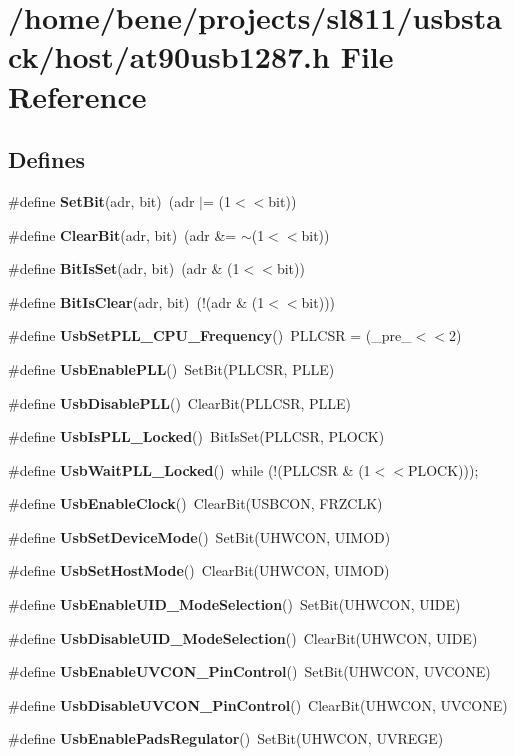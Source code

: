\section{/home/bene/projects/sl811/usbstack/host/at90usb1287.h File Reference}
\label{at90usb1287_8h}
\subsection*{Defines}
\begin{CompactItemize}
\item 
\#define {\bf Set\-Bit}(adr, bit)~(adr $|$=  (1$<$$<$bit))
\item 
\#define {\bf Clear\-Bit}(adr, bit)~(adr \&= $\sim$(1$<$$<$bit))
\item 
\#define {\bf Bit\-Is\-Set}(adr, bit)~(adr \& (1$<$$<$bit))
\item 
\#define {\bf Bit\-Is\-Clear}(adr, bit)~(!(adr \& (1$<$$<$bit)))
\item 
\#define {\bf Usb\-Set\-PLL\_\-CPU\_\-Frequency}()~PLLCSR = (\_\-pre\_\-$<$$<$2)
\item 
\#define {\bf Usb\-Enable\-PLL}()~Set\-Bit(PLLCSR, PLLE)
\item 
\#define {\bf Usb\-Disable\-PLL}()~Clear\-Bit(PLLCSR, PLLE)
\item 
\#define {\bf Usb\-Is\-PLL\_\-Locked}()~Bit\-Is\-Set(PLLCSR, PLOCK)
\item 
\#define {\bf Usb\-Wait\-PLL\_\-Locked}()~while (!(PLLCSR \& (1$<$$<$PLOCK)));
\item 
\#define {\bf Usb\-Enable\-Clock}()~Clear\-Bit(USBCON, FRZCLK)
\item 
\#define {\bf Usb\-Set\-Device\-Mode}()~Set\-Bit(UHWCON, UIMOD)
\item 
\#define {\bf Usb\-Set\-Host\-Mode}()~Clear\-Bit(UHWCON, UIMOD)
\item 
\#define {\bf Usb\-Enable\-UID\_\-Mode\-Selection}()~Set\-Bit(UHWCON, UIDE)
\item 
\#define {\bf Usb\-Disable\-UID\_\-Mode\-Selection}()~Clear\-Bit(UHWCON, UIDE)
\item 
\#define {\bf Usb\-Enable\-UVCON\_\-Pin\-Control}()~Set\-Bit(UHWCON, UVCONE)
\item 
\#define {\bf Usb\-Disable\-UVCON\_\-Pin\-Control}()~Clear\-Bit(UHWCON, UVCONE)
\item 
\#define {\bf Usb\-Enable\-Pads\-Regulator}()~Set\-Bit(UHWCON, UVREGE)
\item 

\end{CompactItemize}
